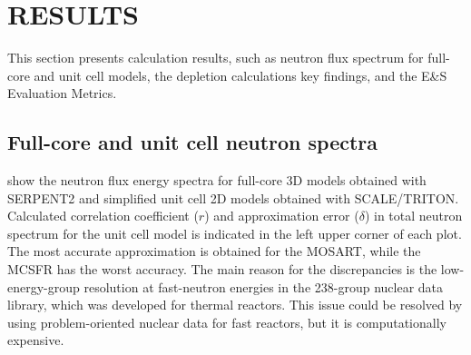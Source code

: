 \documentclass[letterpaper]{mandc2019}
\begin{document}
\section{RESULTS}
This section presents calculation results, such as neutron flux spectrum for full-core and unit cell models, the depletion calculations key findings, and the E\&S Evaluation Metrics.
\subsection{Full-core and unit cell neutron spectra}
\label{sec:spectrum}
 show the neutron flux energy spectra for full-core 3D models obtained with SERPENT2 and simplified unit cell 2D models obtained with SCALE/TRITON. Calculated correlation coefficient ($r$) and approximation error ($\delta$) in total neutron spectrum for the unit cell model is indicated in the left upper corner of each plot. The most accurate approximation is obtained for the \gls{MOSART}, while the \gls{MCSFR} has the worst accuracy. The main reason for the discrepancies is the low-energy-group resolution at fast-neutron energies in the 238-group nuclear data library, which was developed for thermal reactors. This issue could be resolved by using problem-oriented nuclear data for fast reactors, but it is computationally expensive.
\end{document}
